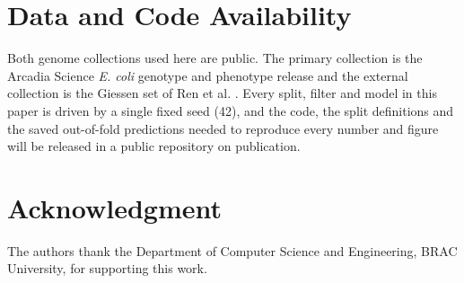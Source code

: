\documentclass[conference]{IEEEtran}
\begin{document}
\section*{Data and Code Availability}

Both genome collections used here are public. The primary collection is the Arcadia
Science \textit{E. coli} genotype and phenotype release \cite{morin2024,york2025}
and the external collection is the Giessen set of Ren et al. \cite{ren2022}. Every
split, filter and model in this paper is driven by a single fixed seed (42), and
the code, the split definitions and the saved out-of-fold predictions needed to
reproduce every number and figure will be released in a public repository on
publication.

\section*{Acknowledgment}

The authors thank the Department of Computer Science and Engineering, BRAC
University, for supporting this work.
\end{document}
